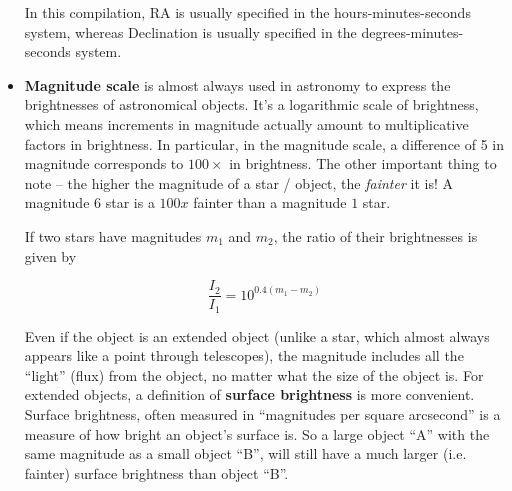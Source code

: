 \begin{itemize}
  In this compilation, RA is usually specified in the
  hours-minutes-seconds system, whereas Declination is usually
  specified in the degrees-minutes-seconds system.

\item \textbf{Magnitude scale} is almost always used in astronomy to
  express the brightnesses of astronomical objects. It's a logarithmic
  scale of brightness, which means increments in magnitude actually
  amount to multiplicative factors in brightness. In particular, in
  the magnitude scale, a difference of 5 in magnitude corresponds to
  $100 \times$ in brightness. The other important thing to note -- the
  higher the magnitude of a star / object, the \emph{fainter} it is! A
  magnitude $6$ star is a $100 x$ fainter than a magnitude $1$ star.

  If two stars have magnitudes $m_1$ and $m_2$, the ratio of their
  brightnesses is given by

  \begin{equation}
    \frac{I_2}{I_1} = 10^{0.4(m_1 - m_2)}
  \end{equation}

  Even if the object is an extended object (unlike a star, which
  almost always appears like a point through telescopes), the
  magnitude includes all the ``light'' (flux) from the object, no
  matter what the size of the object is. For extended objects, a
  definition of \textbf{surface brightness} is more
  convenient. Surface brightness, often measured in ``magnitudes per
  square arcsecond'' is a measure of how bright an object's surface
  is. So a large object ``A'' with the same magnitude as a small
  object ``B'', will still have a much larger (i.e. fainter) surface
  brightness than object ``B''.

\end{itemize}
